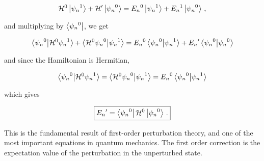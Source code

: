\documentclass[12pt, titlepage]{article}
\begin{document}
\begin{equation*}
	\mathcal{H}^0\ket{{\psi_n}^1} + \mathcal{H}^{\prime}\ket{{\psi_n}^0} = {E_n}^0\ket{{\psi_n}^1} + {E_n}^1\ket{{\psi_n}^0} \,,
\end{equation*}

and multiplying by $\bra{{\psi_n}^0}$, we get

\begin{equation}
	\bra{{\psi_n}^0}\ket{\mathcal{H}^0{\psi_n}^1} + \bra{\mathcal{H}^0{\psi_n}^0}\ket{{\psi_n}^1} = {E_n}^0\bra{{\psi_n}^0}\ket{{\psi_n}^1} + {E_n}^{\prime}\bra{{\psi_n}^0}\ket{{\psi_n}^0}
\end{equation}

and since the Hamiltonian is Hermitian,

\begin{equation*}
	\bra{{\psi_n}^0}\ket{\mathcal{H}^0{\psi_n}^1} = \bra{\mathcal{H}^0{\psi_n}^0}\ket{{\psi_n}^1} = {E_n}^0\bra{{\psi_n}^0}\ket{{\psi_n}^1}
\end{equation*}

which gives

\begin{equation}
	\boxed{ {E_n}^{\prime} = \bra{{\psi_n}^0}\mathcal{H}^0\ket{{\psi_n}^0}\,. }
\end{equation}

This is the fundamental result of first-order perturbation theory, and one of the most important equations in quantum mechanics. The first order correction is the expectation value of the perturbation in the unperturbed state.
\end{document}
